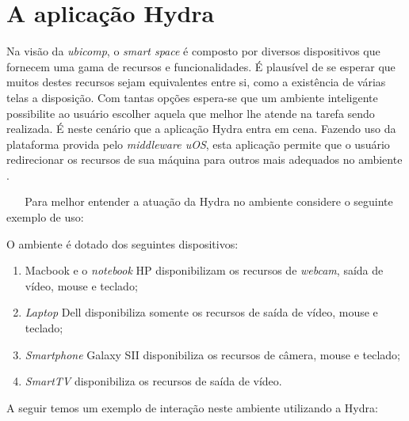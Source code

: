 \section{A aplicação Hydra}
\label{sec:hydra}
	
	
	Na visão da \textit{ubicomp}, o \textit{smart space} é composto por diversos dispositivos que
	fornecem uma gama de recursos e funcionalidades. É plausível de se esperar que muitos destes
	recursos sejam equivalentes entre si, como a existência de várias telas a disposição. Com tantas
	opções espera-se que um ambiente inteligente possibilite ao usuário escolher aquela que melhor lhe
	atende na tarefa sendo realizada. É neste cenário que a aplicação Hydra entra em cena. Fazendo uso
	da plataforma provida pelo \textit{middleware uOS}, esta aplicação permite que o usuário
	redirecionar os recursos de sua máquina para outros mais adequados no ambiente \cite{almeida}.

    Para melhor entender a atuação da Hydra no ambiente considere o seguinte exemplo de uso:
	 
	O ambiente é dotado dos seguintes dispositivos:
	 
	
	\begin{enumerate}
		\item Macbook e o \textit{notebook} HP disponibilizam os recursos de \textit{webcam}, saída de
		vídeo, mouse e teclado;
		\item \textit{Laptop} Dell disponibiliza somente os recursos de saída de vídeo, mouse e teclado;
		\item \textit{Smartphone} Galaxy SII disponibiliza os recursos de câmera, mouse e teclado;
		\item \textit{SmartTV} disponibiliza os recursos de saída de vídeo. 
	\end{enumerate}
	
	A seguir temos um exemplo de interação neste ambiente utilizando a Hydra:

